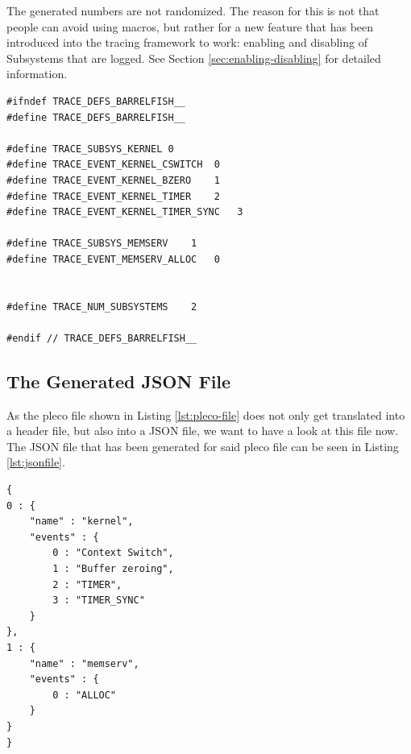 \documentclass[a4paper,11pt,twoside]{report}
\begin{document}
The generated numbers are not randomized. The reason for this is not that people
can avoid using macros, but rather for a new feature that has been introduced
into the tracing framework to work: enabling and disabling of Subsystems that
are logged. See Section \ref{sec:enabling-disabling} for detailed information.

\begin{code}
\begin{lstlisting}[frame=single, caption={A header file that has been generated
	based on the pleco file shown in Listing \ref{lst:pleco-file}.}, label={lst:headerfile}]
#ifndef TRACE_DEFS_BARRELFISH__                                                          
#define TRACE_DEFS_BARRELFISH__

#define TRACE_SUBSYS_KERNEL 0
#define TRACE_EVENT_KERNEL_CSWITCH  0
#define TRACE_EVENT_KERNEL_BZERO    1
#define TRACE_EVENT_KERNEL_TIMER    2
#define TRACE_EVENT_KERNEL_TIMER_SYNC   3

#define TRACE_SUBSYS_MEMSERV    1
#define TRACE_EVENT_MEMSERV_ALLOC   0


#define TRACE_NUM_SUBSYSTEMS    2

#endif // TRACE_DEFS_BARRELFISH__ 

\end{lstlisting}
\end{code}

\subsection{The Generated JSON File}

As the pleco file shown in Listing  \ref{lst:pleco-file} does not only get
translated into a header file, but also into a JSON file, we want to have a look
at this file now. The JSON file that has been generated for said pleco file can
be seen in Listing \ref{lst:jsonfile}.

\begin{code}
\begin{lstlisting}[frame=single, caption={A JSON file that has been generated
	based on the pleco file shown in Listing \ref{lst:pleco-file}. This file can
be used by Aquarium to decode log traces.}, label={lst:jsonfile}]
{                                                                                        
0 : { 
    "name" : "kernel",
    "events" : { 
        0 : "Context Switch",
        1 : "Buffer zeroing",
        2 : "TIMER",
        3 : "TIMER_SYNC"
    }   
},
1 : { 
    "name" : "memserv",
    "events" : { 
        0 : "ALLOC"
    }   
}
}
\end{lstlisting}
\end{code}
\end{document}

